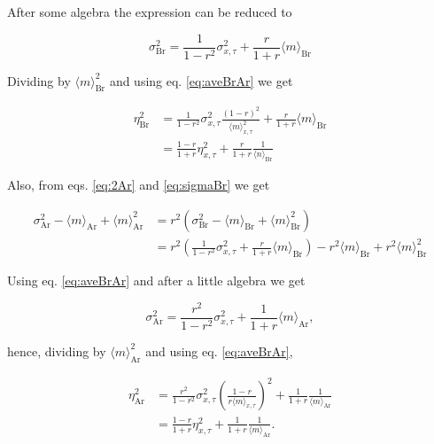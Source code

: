 After some algebra the expression can be reduced to

\begin{equation}
  \label{eq:sigmaBr}
  \sigma^2_\text{Br} = \frac{1}{1-r^2}\sigma^2_{x,\tau}+\frac{r}{1+r}\langle m\rangle_\text{Br}
\end{equation}

Dividing by $\langle m\rangle_\text{Br}^2$ and using eq. \ref{eq:aveBrAr} we get

\begin{equation}
  \label{eq:bur-etaBr}
  \begin{split}
    \eta_\text{Br}^2 &= \frac{1}{1-r^2}\sigma_{x,\tau}^2\frac{(1-r)^2}{\langle m\rangle_{x,\tau}^2} + \frac{r}{1+r}\langle m\rangle_\text{Br}\\
    & = \frac{1-r}{1+r}\eta_{x,\tau}^2+\frac{r}{1+r}\frac{1}{\langle n\rangle_\text{Br}}
  \end{split}
\end{equation}

Also, from eqs. \ref{eq:2Ar} and \ref{eq:sigmaBr} we get

\begin{equation}
  \begin{split}
    \sigma^2_\text{Ar} - \langle m\rangle_\text{Ar} + \langle m\rangle_\text{Ar}^2 &= r^2\left(\sigma^2_\text{Br}- \langle m\rangle_\text{Br} + \langle m\rangle^2_\text{Br}\right)\\
  &=r^2\left(\frac{1}{1-r^2}\sigma^2_{x,\tau}+\frac{r}{1+r}\langle m\rangle_\text{Br}\right)-r^2\langle m\rangle_\text{Br} + r^2\langle m\rangle^2_\text{Br}
  \end{split}
\end{equation}

Using eq. \ref{eq:aveBrAr} and after a little algebra we get

\begin{equation}
  \sigma^2_\text{Ar} = \frac{r^2}{1-r^2}\sigma^2_{x,\tau}+\frac{1}{1+r}\langle m\rangle_\text{Ar},
\end{equation}

hence, dividing by $\langle m\rangle_\text{Ar}^2$ and using eq. \eqref{eq:aveBrAr},

\begin{equation}
  \begin{split}
    \eta^2_\text{Ar} &= \frac{r^2}{1-r^2}\sigma^2_{x,\tau}\left(\frac{1-r}{r\langle m\rangle_{x,\tau}}\right)^2+\frac{1}{1+r}\frac{1}{\langle m\rangle_\text{Ar}}\\
    &=\frac{1-r}{1+r}\eta^2_{x,\tau}+\frac{1}{1+r}\frac{1}{\langle m\rangle_\text{Ar}}.
  \end{split}
\end{equation}


